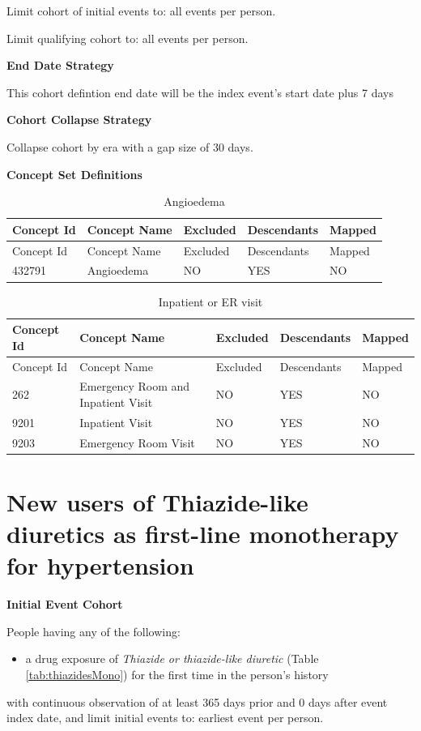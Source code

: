 \documentclass[]{book}
\providecommand{\tightlist}{%
  \setlength{\itemsep}{0pt}\setlength{\parskip}{0pt}}
\begin{document}
Limit cohort of initial events to: all events per person.

Limit qualifying cohort to: all events per person.

\textbf{End Date Strategy}

This cohort defintion end date will be the index event's start date plus
7 days

\textbf{Cohort Collapse Strategy}

Collapse cohort by era with a gap size of 30 days.

\textbf{Concept Set Definitions}

\begin{longtable}[]{@{}lllll@{}}
\caption{\label{tab:angioedema} Angioedema}\tabularnewline
\toprule
Concept Id & Concept Name & Excluded & Descendants &
Mapped\tabularnewline
\midrule
\endfirsthead
\toprule
Concept Id & Concept Name & Excluded & Descendants &
Mapped\tabularnewline
\midrule
\endhead
432791 & Angioedema & NO & YES & NO\tabularnewline
\bottomrule
\end{longtable}

\begin{longtable}[]{@{}lllll@{}}
\caption{\label{tab:inpatientOrEr} Inpatient or ER visit}\tabularnewline
\toprule
Concept Id & Concept Name & Excluded & Descendants &
Mapped\tabularnewline
\midrule
\endfirsthead
\toprule
Concept Id & Concept Name & Excluded & Descendants &
Mapped\tabularnewline
\midrule
\endhead
262 & Emergency Room and Inpatient Visit & NO & YES & NO\tabularnewline
9201 & Inpatient Visit & NO & YES & NO\tabularnewline
9203 & Emergency Room Visit & NO & YES & NO\tabularnewline
\bottomrule
\end{longtable}

\section{New users of Thiazide-like diuretics as first-line monotherapy
for hypertension}\label{ThiazidesMono}

\textbf{Initial Event Cohort}

People having any of the following:

\begin{itemize}
\tightlist
\item
  a drug exposure of \emph{Thiazide or thiazide-like diuretic} (Table
  \ref{tab:thiazidesMono}) for the first time in the person's history
\end{itemize}

with continuous observation of at least 365 days prior and 0 days after
event index date, and limit initial events to: earliest event per
person.
\end{document}
